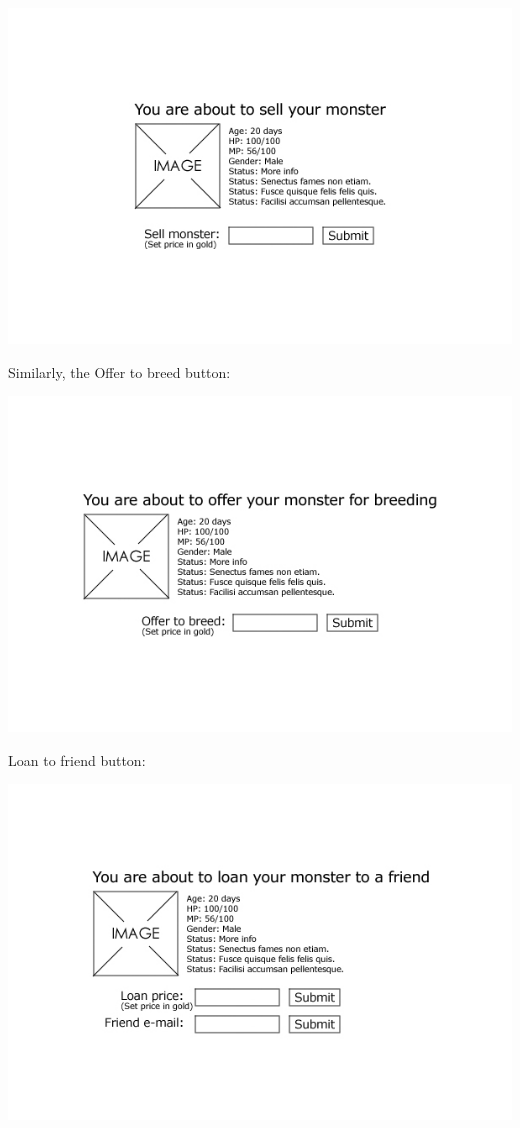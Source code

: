 \documentclass[a4paper]{article}
\begin{document}
\includegraphics[width=\textwidth]{img/UI6.jpg}

Similarly, the Offer to breed button:

\includegraphics[width=\textwidth]{img/UI7.jpg}

Loan to friend button:

\includegraphics[width=\textwidth]{img/UILoan.jpg}
\clearpage
\end{document}
